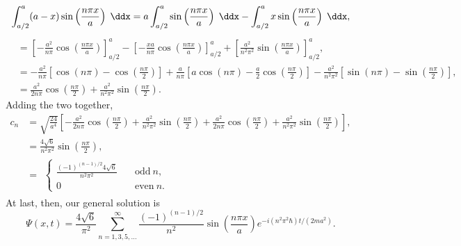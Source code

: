 \begin{example}
\begin{itemize}
            \begin{equation*}
                \int_{a/2}^a (a-x)\sin\left(\frac{n\pi x}{a}\right) \;\ddx = a\int_{a/2}^a \sin\left(\frac{n\pi x}{a}\right) \;\ddx - \int_{a/2}^a x\sin\left(\frac{n\pi x}{a}\right)\;\ddx,
            \end{equation*}
            \begin{align*}
                &= \left[-\frac{a^2}{n\pi} \cos\left(\frac{n\pi x}{a}\right)\right]_{a/2}^a - \left[-\frac{xa}{n\pi} \cos\left(\frac{n\pi x}{a}\right)\right]_{a/2}^a + \left[\frac{a^2}{n^2\pi^2} \sin\left(\frac{n\pi x}{a}\right)\right]_{a/2}^a, \\
                &= -\frac{a^2}{n\pi} \left[\cos(n\pi) - \cos\left(\frac{n\pi}{2}\right)\right] + \frac{a}{n\pi} \left[a\cos(n\pi) - \frac{a}{2}\cos(\frac{n\pi}{2})\right] - \frac{a^2}{n^2\pi^2}\left[\sin(n\pi) - \sin\left(\frac{n\pi}{2}\right)\right], \\
                &= \frac{a^2}{2n\pi}\cos\left(\frac{n\pi}{2}\right) + \frac{a^2}{n^2\pi^2}\sin\left(\frac{n\pi}{2}\right).
            \end{align*}
            Adding the two together,
            \begin{align*}
                c_n &= \sqrt{\frac{24}{a^4}} \left[-\frac{a^2}{2n\pi}\cos\left(\frac{n\pi}{2}\right) + \frac{a^2}{n^2\pi^2}\sin\left(\frac{n\pi}{2}\right) + \frac{a^2}{2n\pi}\cos\left(\frac{n\pi}{2}\right) + \frac{a^2}{n^2\pi^2}\sin\left(\frac{n\pi}{2}\right)\right], \\
                &= \frac{4\sqrt{6}}{n^2\pi^2}\sin\left(\frac{n\pi}{2}\right), \\
                &=
                    \begin{alignedat}{2}
                    \begin{cases}
                        \frac{(-1)^{(n-1)/2}4\sqrt{6}}{n^2\pi^2} \quad &\text{odd}\ n, \\
                        0 & \text{even}\ n.
                    \end{cases}
                \end{alignedat}
            \end{align*}
            At last, then, our general solution is
            \begin{equation*}
                \boxed{\Psi(x,t) = \frac{4\sqrt{6}}{\pi^2} \sum^{\infty}_{n=1,3,5,\ldots} \frac{(-1)^{(n-1)/2}}{n^2} \sin\left(\frac{n\pi x}{a}\right)e^{-i(n^2\pi^2\hbar)t/(2ma^2)}.}
            \end{equation*}
    \end{itemize}


\end{example}

